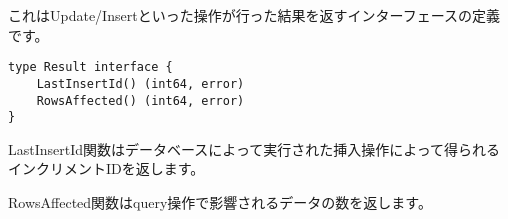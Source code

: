 これはUpdate/Insertといった操作が行った結果を返すインターフェースの定義です。

\begin{lstlisting}[numbers=none]
type Result interface {
    LastInsertId() (int64, error)
    RowsAffected() (int64, error)
}
\end{lstlisting}

LastInsertId関数はデータベースによって実行された挿入操作によって得られるインクリメントIDを返します。

RowsAffected関数はquery操作で影響されるデータの数を返します。
